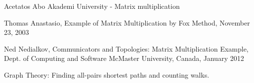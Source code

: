 \documentclass[10pt,a4paper,final]{report}
\begin{document}



\begin{thebibliography}{99}
Acetatos Abo Akademi University - Matrix multiplication

Thomas Anastasio, Example of Matrix Multiplication by Fox Method, November 23, 2003

 Ned Nedialkov,  Communicators and Topologies: Matrix Multiplication Example, Dept. of Computing and Software McMaster University, Canada, January 2012

 Graph Theory: Finding all-pairs shortest paths and counting walks. 

\end{thebibliography}
  
\end{document}
